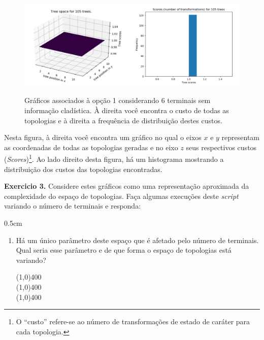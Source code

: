 \begin{refsection}
  \begin{figure}[H]
  \centering
       \centering
      {\includegraphics[scale=0.65]{figures/tut3/opcao_1_6_terminals.pdf}}
      {\caption[\textit{\textit{No informative characters} }]{Gráficos associados à opção 1 considerando 6 terminais sem informação cladística. À direita você encontra o custo de todas as topologias e à direita a frequência de distribuição destes custos.}\label{tut3:fig:flat}}
  \end{figure}



	Nesta figura, à direita você encontra um gráfico no qual o eixos $x$ e $y$ representam as coordenadas de todas as topologias geradas e no eixo $z$ seus respectivos custos  (\textit{Scores})\footnote{O ``custo'' refere-se ao número de transformações de estado de caráter para cada topologia.}. Ao lado direito desta figura, há um histograma mostrando a distribuição dos custos das topologias encontradas.\\

\begin{blackBlock}{\textbf{Exercicio 3.}}\label{tut3:ex:3.\arabic{ex}}
	Considere estes gráficos como uma representação aproximada da complexidade do espaço de topologias. Faça algumas execuções deste \textit{script} variando o número de terminais e responda:
\begin {myindentpar}{0.5cm}
\begin{enumerate}[\itshape i.]
 \item{Há um único parâmetro deste espaço que é afetado pelo número de terminais. Qual seria esse parâmetro e de que forma o espaço de topologias está variando?}\label{tut3:ex1}\\
  \begin{center}
  \line(1,0){400}\\
  \line(1,0){400}\\
  \line(1,0){400}\\
  \end{center}


\end{enumerate}
\end{myindentpar}
\end{blackBlock}
\end{refsection}
